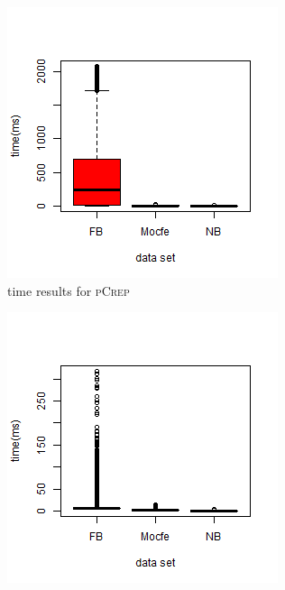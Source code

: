 \documentclass[a4paper,UKenglish,cleveref, autoref, thm-restate,authorcolumns]{lipics-v2019}
\newcommand{\adjDel}{\textsc{pCrep}}
\begin{document}
\begin{figure}[h]
	\centering
	\begin{minipage}{0.48\linewidth}
		\begin{subfigure}[b]{\linewidth}
			\includegraphics*[width=\linewidth]{"plots/time_all_filtered_decompTree"}
			\caption{time results for \adjDel}
		\end{subfigure}		
	\end{minipage}
	\begin{minipage}{0.48\linewidth}
		\begin{subfigure}[b]{\linewidth}
			\includegraphics*[width=\linewidth]{"plots/time_all_filtered_compDecomp"}

\end{subfigure}
\end{minipage}
\end{figure}
\end{document}
